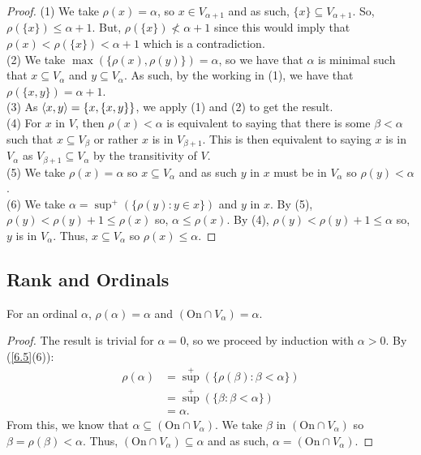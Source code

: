 \begin{proof}
    (1) We take $\rho(x) = \alpha$, so $x \in V_{\alpha + 1}$
    and as such, $\{x\} \subseteq V_{\alpha + 1}$. So, 
    $\rho(\{x\}) \leq \alpha + 1$. But, $\rho(\{x\}) \nless \alpha + 1$
    since this would imply that $\rho(x) < \rho(\{x\}) < \alpha + 1$
    which is a contradiction.
    \\[\baselineskip]
    (2) We take $\max(\{\rho(x), \rho(y)\}) = \alpha$, so we have that
    $\alpha$ is minimal such that $x \subseteq V_\alpha$ and
    $y \subseteq V_\alpha$. As such, by the working in (1), we have
    that $\rho(\{x, y\}) = \alpha + 1$.
    \\[\baselineskip]
    (3) As ${\langle x, y \rangle} = \{x, \{x, y\}\}$, we apply (1) and (2) to get
    the result.
    \\[\baselineskip]
    (4) For $x$ in $V$, then $\rho(x) < \alpha$ is equivalent to
    saying that there is some $\beta < \alpha$ such that $x \subseteq V_\beta$
    or rather $x$ is in $V_{\beta + 1}$. This is then equivalent to
    saying $x$ is in $V_\alpha$ as $V_{\beta + 1} \subseteq V_\alpha$
    by the transitivity of $V$.
    \\[\baselineskip]
    (5) We take $\rho(x) = \alpha$ so $x \subseteq V_\alpha$ and as such
    $y$ in $x$ must be in $V_\alpha$ so $\rho(y) < \alpha$.
    \\[\baselineskip]
    (6) We take $\alpha = \sup^+(\{\rho(y) : y \in x\})$ and $y$ in $x$.
    By (5), $\rho(y) < \rho(y) + 1 \leq \rho(x)$ so, $\alpha \leq \rho(x)$. 
    By (4), $\rho(y) < \rho(y) + 1 \leq \alpha$ so, $y$ is in $V_\alpha$.
    Thus, $x \subseteq V_\alpha$ so $\rho(x) \leq \alpha$.
\end{proof}

\subsection{Rank and Ordinals} \label{6.6}

For an ordinal $\alpha$, $\rho(\alpha) = \alpha$ and 
$(\text{On} \cap V_\alpha) = \alpha$.

\begin{proof}
    The result is trivial for $\alpha = 0$, so we proceed by
    induction with $\alpha > 0$. By (\ref{6.5}(6)): \begin{align*}
        \rho(\alpha) 
        &= {\sup}^+(\{\rho(\beta) : \beta < \alpha\}) \\
        &= {\sup}^+(\{\beta : \beta < \alpha\}) \tag{IH} \\
        &= \alpha.
    \end{align*} From this, we know that 
    $\alpha \subseteq (\text{On} \cap V_\alpha)$. We take
    $\beta$ in $(\text{On} \cap V_\alpha)$ so 
    $\beta = \rho(\beta) < \alpha$. 
    Thus, $(\text{On} \cap V_\alpha) \subseteq \alpha$ and as such,
    $\alpha = (\text{On} \cap V_\alpha)$.
\end{proof}

